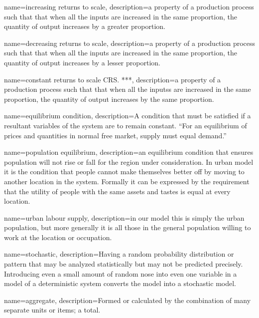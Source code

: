 
{
name=increasing returns to scale,
description={a property of a production process  such that that when all the inputs are increased in the same proportion, the quantity of \gls{output} increases by a greater proportion.}
}

{
name=decreasing returns to scale,
description={a property of a production process  such that that when all the inputs are increased in the same proportion, the quantity of \gls{output} increases by a lesser proportion.}
}

{
name=constant returns to scale \gls{CRS}. ***,
description={a property of a production process such that that when all
the \glspl{input}s are increased in the same proportion, the quantity of \gls{output} increases by the same proportion.  }
}

{
name=equilibrium condition,
description={A condition that must be satisfied if a resultant variables of the system are to remain constant. ``For an equilibrium of prices and quantities in normal free \gls{market}, supply must equal demand.''}
}

{
name=population equilibrium,
description={an \gls{equilibrium condition} that ensures population will not rise or fall  for the region under consideration. In urban model it is the condition that people cannot make themselves better off by moving to another location in the system. Formally it can be expressed by the requirement that the utility of people with the same  assets and tastes is equal at every location. }
}

{
name=urban labour supply,
description={in our model this is simply the urban population, but more generally it is all those in the general population willing to work at the location or occupation.}
}

{
name=stochastic,
description={Having a random probability distribution or pattern that may be analyzed statistically but may not be predicted precisely. Introducing even a small amount of random nose into even one variable in a model of a deterministic system converts the model into a stochastic model.}
}

{
name=aggregate,
description={Formed or calculated by the combination of many separate units or items; a total.}
}

